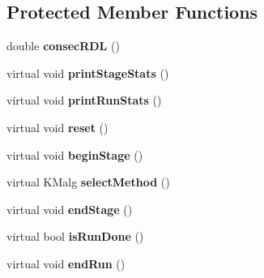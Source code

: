 \subsection*{Protected Member Functions}
\begin{DoxyCompactItemize}
\item 
\hypertarget{class_k_mlocal_e_z___hybrid_ae901f750a1770245c180104d595acf5a}{
double {\bfseries consecRDL} ()}
\label{class_k_mlocal_e_z___hybrid_ae901f750a1770245c180104d595acf5a}

\item 
\hypertarget{class_k_mlocal_e_z___hybrid_a7f92dd66c389e49980d4277f9e5f8737}{
virtual void {\bfseries printStageStats} ()}
\label{class_k_mlocal_e_z___hybrid_a7f92dd66c389e49980d4277f9e5f8737}

\item 
\hypertarget{class_k_mlocal_e_z___hybrid_a5afb32b0159ae8eb1ceb74086322e851}{
virtual void {\bfseries printRunStats} ()}
\label{class_k_mlocal_e_z___hybrid_a5afb32b0159ae8eb1ceb74086322e851}

\item 
\hypertarget{class_k_mlocal_e_z___hybrid_a8de143716792f07b224b2d4cdd0d2efd}{
virtual void {\bfseries reset} ()}
\label{class_k_mlocal_e_z___hybrid_a8de143716792f07b224b2d4cdd0d2efd}

\item 
\hypertarget{class_k_mlocal_e_z___hybrid_a49d143141e8da8607aca776ce7e71436}{
virtual void {\bfseries beginStage} ()}
\label{class_k_mlocal_e_z___hybrid_a49d143141e8da8607aca776ce7e71436}

\item 
\hypertarget{class_k_mlocal_e_z___hybrid_a474d9d8312461f39e53e0162eee6b8c3}{
virtual KMalg {\bfseries selectMethod} ()}
\label{class_k_mlocal_e_z___hybrid_a474d9d8312461f39e53e0162eee6b8c3}

\item 
\hypertarget{class_k_mlocal_e_z___hybrid_a635624bcc3b66eb0b3fd21d8cc65c86d}{
virtual void {\bfseries endStage} ()}
\label{class_k_mlocal_e_z___hybrid_a635624bcc3b66eb0b3fd21d8cc65c86d}

\item 
\hypertarget{class_k_mlocal_e_z___hybrid_af32a295ee0a1e70232e4cd5b8cb1e96b}{
virtual bool {\bfseries isRunDone} ()}
\label{class_k_mlocal_e_z___hybrid_af32a295ee0a1e70232e4cd5b8cb1e96b}

\item 
\hypertarget{class_k_mlocal_e_z___hybrid_a735c0926a3e33848a59be43a5e3b539c}{
virtual void {\bfseries endRun} ()}
\label{class_k_mlocal_e_z___hybrid_a735c0926a3e33848a59be43a5e3b539c}


\end{DoxyCompactItemize}
